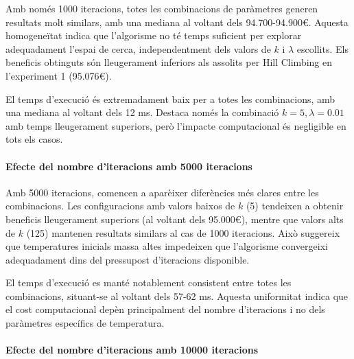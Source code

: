 Amb només 1000 iteracions, totes les combinacions de paràmetres generen resultats molt similars, amb una mediana al voltant dels 94.700-94.900€. Aquesta homogeneïtat indica que l'algorisme no té temps suficient per explorar adequadament l'espai de cerca, independentment dels valors de $k$ i $\lambda$ escollits. Els beneficis obtinguts són lleugerament inferiors als assolits per Hill Climbing en l'experiment 1 (95.076€).

\vspace{0.5cm}

\vspace{0.5cm}

El temps d'execució és extremadament baix per a totes les combinacions, amb una mediana al voltant dels 12 ms. Destaca només la combinació $k=5, \lambda=0.01$ amb temps lleugerament superiors, però l'impacte computacional és negligible en tots els casos.

\paragraph{Efecte del nombre d'iteracions amb 5000 iteracions}

\vspace{0.5cm}

\vspace{0.5cm}

Amb 5000 iteracions, comencen a aparèixer diferències més clares entre les combinacions. Les configuracions amb valors baixos de $k$ (5) tendeixen a obtenir beneficis lleugerament superiors (al voltant dels 95.000€), mentre que valors alts de $k$ (125) mantenen resultats similars al cas de 1000 iteracions. Això suggereix que temperatures inicials massa altes impedeixen que l'algorisme convergeixi adequadament dins del pressupost d'iteracions disponible.

\vspace{0.5cm}

\vspace{0.5cm}

El temps d'execució es manté notablement consistent entre totes les combinacions, situant-se al voltant dels 57-62 ms. Aquesta uniformitat indica que el cost computacional depèn principalment del nombre d'iteracions i no dels paràmetres específics de temperatura.

\paragraph{Efecte del nombre d'iteracions amb 10000 iteracions}

